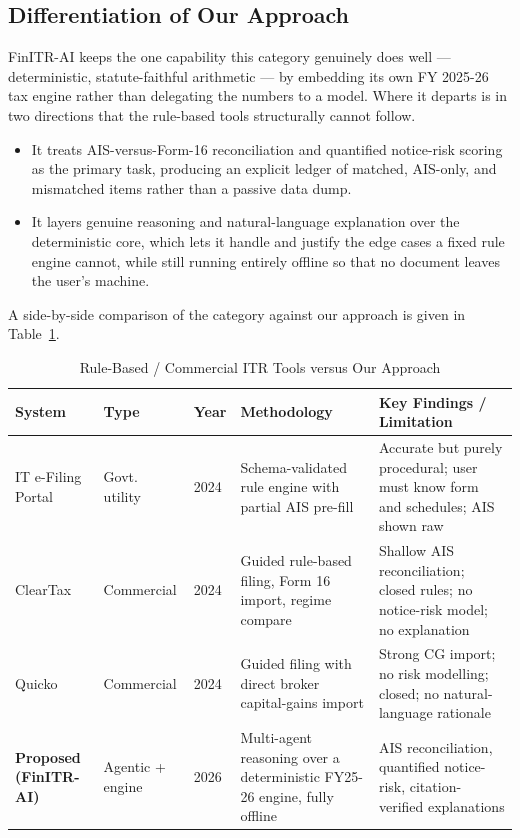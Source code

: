 \subsection{Differentiation of Our Approach}
FinITR-AI keeps the one capability this category genuinely does well ---
deterministic, statute-faithful arithmetic --- by embedding its own FY 2025-26
tax engine rather than delegating the numbers to a model. Where it departs is in
two directions that the rule-based tools structurally cannot follow.

\begin{itemize}
    \item It treats AIS-versus-Form-16 reconciliation and quantified notice-risk
          scoring as the primary task, producing an explicit ledger of matched,
          AIS-only, and mismatched items rather than a passive data dump.
    \item It layers genuine reasoning and natural-language explanation over the
          deterministic core, which lets it handle and justify the edge cases a
          fixed rule engine cannot, while still running entirely offline so that
          no document leaves the user's machine.
\end{itemize}

A side-by-side comparison of the category against our approach is given in
Table~\ref{tab:cat-a-comparison}.

\begin{table}[H]
\centering
\caption{Rule-Based / Commercial ITR Tools versus Our Approach}
\label{tab:cat-a-comparison}
\small
\begin{tabularx}{\textwidth}{|l|l|l|X|X|}
\hline
\textbf{System} & \textbf{Type} & \textbf{Year} & \textbf{Methodology} & \textbf{Key Findings / Limitation} \\
\hline
IT e-Filing Portal \cite{ref1} & Govt. utility & 2024 & Schema-validated rule engine with partial AIS pre-fill & Accurate but purely procedural; user must know form and schedules; AIS shown raw \\
\hline
ClearTax \cite{ref2} & Commercial & 2024 & Guided rule-based filing, Form 16 import, regime compare & Shallow AIS reconciliation; closed rules; no notice-risk model; no explanation \\
\hline
Quicko \cite{ref3} & Commercial & 2024 & Guided filing with direct broker capital-gains import & Strong CG import; no risk modelling; closed; no natural-language rationale \\
\hline
\textbf{Proposed (FinITR-AI)} & Agentic + engine & 2026 & Multi-agent reasoning over a deterministic FY25-26 engine, fully offline & AIS reconciliation, quantified notice-risk, citation-verified explanations \\
\hline
\end{tabularx}
\end{table}

